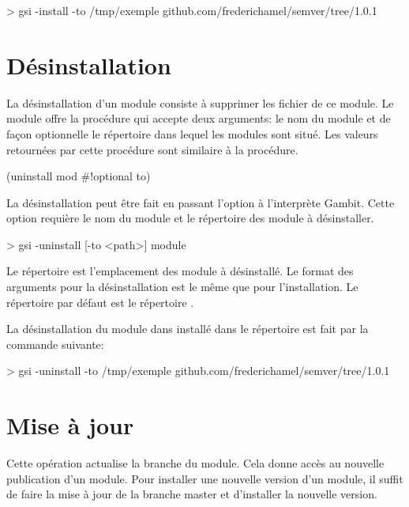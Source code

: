 \begin{center}
  \begin{mplisting}{1}
> gsi -install -to /tmp/exemple github.com/frederichamel/semver/tree/1.0.1
\end{mplisting}
\end{center}

\section{Désinstallation}

La désinstallation d'un module consiste à supprimer les fichier
de ce module. Le module  offre la procédure
 qui accepte deux arguments: le nom du module
et de façon optionnelle le répertoire dans lequel les modules
sont situé. Les valeurs retournées par cette procédure sont
similaire à la procédure.
\begin{center}
  \begin{mplisting}{0.4}
(uninstall mod #!optional to)
\end{mplisting}
\end{center}
La désinstallation peut être fait en passant l'option 
à l'interprète Gambit. Cette option requière le nom du module et le
répertoire  des module à désinstaller.
\begin{center}
  \begin{mplisting}{0.8}
> gsi -uninstall [-to <path>] module
\end{mplisting}
\end{center}
Le répertoire  est l'emplacement des module
à désinstallé. Le format des arguments pour la désinstallation
est le même que pour l'installation. Le répertoire par défaut
est le répertoire .

La désinstallation du module  dans installé dans le
répertoire  est fait par la commande suivante:
\begin{center}
  \begin{mplisting}{1}
> gsi -uninstall -to /tmp/exemple github.com/frederichamel/semver/tree/1.0.1
\end{mplisting}
\end{center}


\section{Mise à jour}
Cette opération actualise la branche  du module.
Cela donne accès au nouvelle publication d'un module. Pour installer
une nouvelle version d'un module, il suffit de faire la mise à jour
de la branche master et d'installer la nouvelle version.

